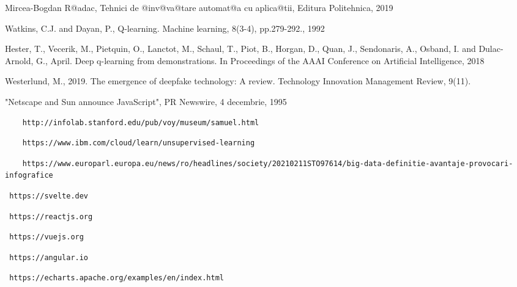 \begin{thebibliography}{99}
 Mircea-Bogdan R@adac, Tehnici de @inv@va@tare automat@a cu aplica@tii, Editura Politehnica, 2019 

 Watkins, C.J. and Dayan, P., Q-learning. Machine learning, 8(3-4), pp.279-292., 1992 

 Hester, T., Vecerik, M., Pietquin, O., Lanctot, M., Schaul, T., Piot, B., Horgan, D., Quan, J., Sendonaris, A., Osband, I. and Dulac-Arnold, G.,  April. Deep q-learning from demonstrations. In Proceedings of the AAAI Conference on Artificial Intelligence, 2018 

 Westerlund, M., 2019. The emergence of deepfake technology: A review. Technology Innovation Management Review, 9(11).



 "Netscape and Sun announce JavaScript", PR Newswire, 4 decembrie, 1995

 \begin{verbatim}
	http://infolab.stanford.edu/pub/voy/museum/samuel.html
\end{verbatim}

 \begin{verbatim}
	https://www.ibm.com/cloud/learn/unsupervised-learning
\end{verbatim}

 \begin{verbatim}
	https://www.europarl.europa.eu/news/ro/headlines/society/20210211STO97614/big-data-definitie-avantaje-provocari-infografice
\end{verbatim}

 \begin{verbatim} https://svelte.dev 
\end{verbatim}

 \begin{verbatim} https://reactjs.org 
\end{verbatim}

 \begin{verbatim} https://vuejs.org 
\end{verbatim}

 \begin{verbatim} https://angular.io 
\end{verbatim}

 \begin{verbatim} https://echarts.apache.org/examples/en/index.html 
\end{verbatim}


\end{thebibliography}
